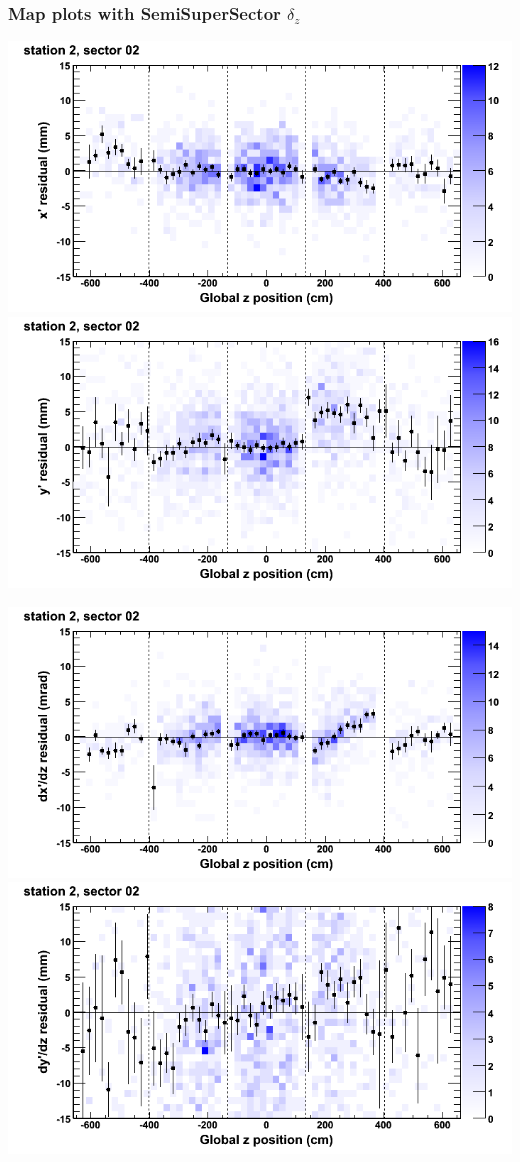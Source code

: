 \documentclass[compress]{beamer}
\begin{document}
\begin{frame}
\frametitle{Map plots with SemiSuperSector $\delta_z$}
\includegraphics[width=0.5\linewidth]{zfit_mapplots/DTvsz_st2sec02_x.png}
\includegraphics[width=0.5\linewidth]{zfit_mapplots/DTvsz_st2sec02_y.png}

\includegraphics[width=0.5\linewidth]{zfit_mapplots/DTvsz_st2sec02_dxdz.png}
\includegraphics[width=0.5\linewidth]{zfit_mapplots/DTvsz_st2sec02_dydz.png}
\end{frame}
\end{document}
